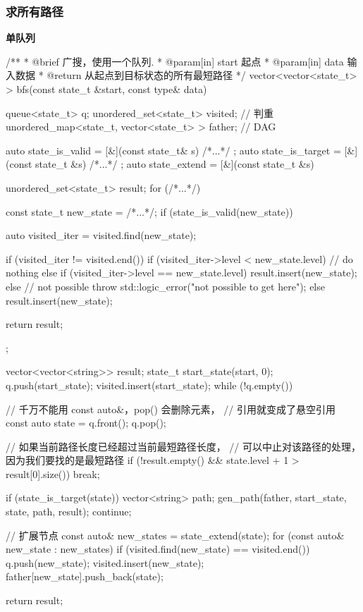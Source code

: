 \subsubsection{求所有路径}

\textbf{单队列}

\begin{Codex}[label=bfs_template.cpp]
/**
 * @brief 广搜，使用一个队列.
 * @param[in] start 起点
 * @param[in] data 输入数据
 * @return 从起点到目标状态的所有最短路径
 */
vector<vector<state_t> > bfs(const state_t &start, const type& data) {
    queue<state_t> q;
    unordered_set<state_t> visited; // 判重
    unordered_map<state_t, vector<state_t> > father; // DAG

    auto state_is_valid = [&](const state_t& s) { /*...*/ };
    auto state_is_target = [&](const state_t &s) { /*...*/ };
    auto state_extend = [&](const state_t &s) {
        unordered_set<state_t> result;
        for (/*...*/) {
            const state_t new_state = /*...*/;
            if (state_is_valid(new_state)) {
                auto visited_iter = visited.find(new_state);

                if (visited_iter != visited.end()) {
                    if (visited_iter->level < new_state.level) {
                        // do nothing
                    } else if (visited_iter->level == new_state.level) {
                        result.insert(new_state);
                    } else { // not possible
                        throw std::logic_error("not possible to get here");
                    }
                } else {
                    result.insert(new_state);
                }
            }
        }

        return result;
    };

    vector<vector<string>> result;
    state_t start_state(start, 0);
    q.push(start_state);
    visited.insert(start_state);
    while (!q.empty()) {
        // 千万不能用 const auto&，pop() 会删除元素，
        // 引用就变成了悬空引用
        const auto state = q.front();
        q.pop();

        // 如果当前路径长度已经超过当前最短路径长度，
        // 可以中止对该路径的处理，因为我们要找的是最短路径
        if (!result.empty() && state.level + 1 > result[0].size()) break;

        if (state_is_target(state)) {
            vector<string> path;
            gen_path(father, start_state, state, path, result);
            continue;
        }

        // 扩展节点
        const auto& new_states = state_extend(state);
        for (const auto& new_state : new_states) {
            if (visited.find(new_state) == visited.end()) {
                q.push(new_state);
            }
            visited.insert(new_state);
            father[new_state].push_back(state);
        }
    }

    return result;
}
\end{Codex}


